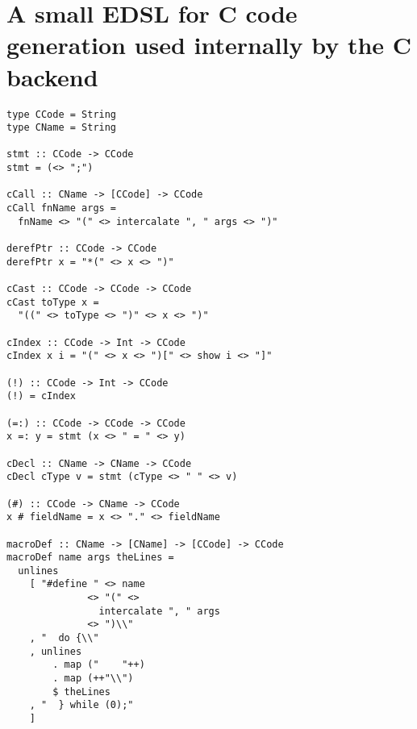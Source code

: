 \documentclass[sigplan,anonymous,review]{acmart}
\newenvironment{todo}
  {\begin{tcolorbox}
   \textbf{TODO}:
  }
  {\end{tcolorbox}
  }
\providecommand\BibTeX{{%
    \normalfont B\kern-0.5em{\scshape i\kern-0.25em b}\kern-0.8em\TeX}}}
\begin{document}
\section{A small EDSL for C code generation used internally by the C backend}
\begin{lstlisting}
type CCode = String
type CName = String

stmt :: CCode -> CCode
stmt = (<> ";")

cCall :: CName -> [CCode] -> CCode
cCall fnName args =
  fnName <> "(" <> intercalate ", " args <> ")"

derefPtr :: CCode -> CCode
derefPtr x = "*(" <> x <> ")"

cCast :: CCode -> CCode -> CCode
cCast toType x =
  "((" <> toType <> ")" <> x <> ")"

cIndex :: CCode -> Int -> CCode
cIndex x i = "(" <> x <> ")[" <> show i <> "]"

(!) :: CCode -> Int -> CCode
(!) = cIndex

(=:) :: CCode -> CCode -> CCode
x =: y = stmt (x <> " = " <> y)

cDecl :: CName -> CName -> CCode
cDecl cType v = stmt (cType <> " " <> v)

(#) :: CCode -> CName -> CCode
x # fieldName = x <> "." <> fieldName

macroDef :: CName -> [CName] -> [CCode] -> CCode
macroDef name args theLines =
  unlines
    [ "#define " <> name
              <> "(" <>
                intercalate ", " args
              <> ")\\"
    , "  do {\\"
    , unlines
        . map ("    "++)
        . map (++"\\")
        $ theLines
    , "  } while (0);"
    ]
\end{lstlisting}






%   
%   
\end{document}
